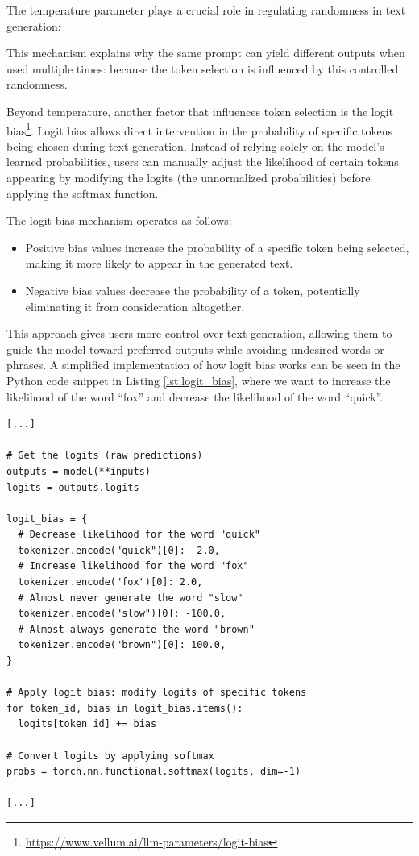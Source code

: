 The temperature parameter plays a crucial role in regulating randomness in text
generation:

This mechanism explains why the same prompt can yield different outputs when
used multiple times: because the token selection is influenced by this controlled
randomness.

Beyond temperature, another factor that influences token selection is the logit
bias\footnote{\url{https://www.vellum.ai/llm-parameters/logit-bias}}. Logit bias
allows direct intervention in the probability of specific tokens being chosen
during text generation. Instead of relying solely on the model's learned probabilities,
users can manually adjust the likelihood of certain tokens appearing by
modifying the logits (the unnormalized probabilities) before applying the
softmax function.

The logit bias mechanism operates as follows:

\begin{itemize}
  \item Positive bias values increase the probability of a specific token being selected,
    making it more likely to appear in the generated text.

  \item Negative bias values decrease the probability of a token, potentially
    eliminating it from consideration altogether.
\end{itemize}

This approach gives users more control over text generation, allowing them to
guide the model toward preferred outputs while avoiding undesired words or
phrases. A simplified implementation of how logit bias works can be seen in the Python
code snippet in Listing \ref{lst:logit_bias}, where we want to increase the
likelihood of the word ``fox'' and decrease the likelihood of the word ``quick''.

\vspace{10mm}
\begin{codewindow}
    \begin{lstlisting}
[...]

# Get the logits (raw predictions)
outputs = model(**inputs)
logits = outputs.logits

logit_bias = {
  # Decrease likelihood for the word "quick"
  tokenizer.encode("quick")[0]: -2.0,
  # Increase likelihood for the word "fox"
  tokenizer.encode("fox")[0]: 2.0,
  # Almost never generate the word "slow"
  tokenizer.encode("slow")[0]: -100.0,
  # Almost always generate the word "brown"
  tokenizer.encode("brown")[0]: 100.0,
}

# Apply logit bias: modify logits of specific tokens
for token_id, bias in logit_bias.items():
  logits[token_id] += bias

# Convert logits by applying softmax
probs = torch.nn.functional.softmax(logits, dim=-1)

[...]
\end{lstlisting}
\end{codewindow}
\vspace{10mm}


